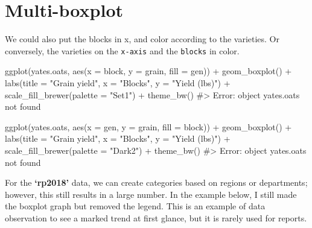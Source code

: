 \documentclass[
  letterpaper,
  DIV=11,
  numbers=noendperiod]{scrreprt}
\newenvironment{Shaded}{\begin{snugshade}}{\end{snugshade}}
\newcommand{\AttributeTok}[1]{\textcolor[rgb]{0.40,0.45,0.13}{#1}}
\newcommand{\CommentTok}[1]{\textcolor[rgb]{0.37,0.37,0.37}{#1}}
\newcommand{\FunctionTok}[1]{\textcolor[rgb]{0.28,0.35,0.67}{#1}}
\newcommand{\NormalTok}[1]{\textcolor[rgb]{0.00,0.23,0.31}{#1}}
\newcommand{\SpecialCharTok}[1]{\textcolor[rgb]{0.37,0.37,0.37}{#1}}
\newcommand{\StringTok}[1]{\textcolor[rgb]{0.13,0.47,0.30}{#1}}
\begin{document}
\section{Multi-boxplot}\label{multi-boxplot}

We could also put the blocks in x, and color according to the varieties.
Or conversely, the varieties on the \texttt{x-axis} and the
\texttt{blocks} in color.

\begin{Shaded}
\begin{Highlighting}[]

\FunctionTok{ggplot}\NormalTok{(yates.oats, }\FunctionTok{aes}\NormalTok{(}\AttributeTok{x =}\NormalTok{ block, }\AttributeTok{y =}\NormalTok{ grain, }\AttributeTok{fill =}\NormalTok{ gen)) }\SpecialCharTok{+}
  \FunctionTok{geom\_boxplot}\NormalTok{() }\SpecialCharTok{+}
  \FunctionTok{labs}\NormalTok{(}\AttributeTok{title =} \StringTok{"Grain yield"}\NormalTok{, }\AttributeTok{x =} \StringTok{"Blocks"}\NormalTok{, }\AttributeTok{y =} \StringTok{"Yield (lbs)"}\NormalTok{) }\SpecialCharTok{+}
  \FunctionTok{scale\_fill\_brewer}\NormalTok{(}\AttributeTok{palette =} \StringTok{"Set1"}\NormalTok{) }\SpecialCharTok{+}
  \FunctionTok{theme\_bw}\NormalTok{()}
\CommentTok{\#\textgreater{} Error: object \textquotesingle{}yates.oats\textquotesingle{} not found}


\FunctionTok{ggplot}\NormalTok{(yates.oats, }\FunctionTok{aes}\NormalTok{(}\AttributeTok{x =}\NormalTok{ gen, }\AttributeTok{y =}\NormalTok{ grain, }\AttributeTok{fill =}\NormalTok{ block)) }\SpecialCharTok{+}
  \FunctionTok{geom\_boxplot}\NormalTok{() }\SpecialCharTok{+}
  \FunctionTok{labs}\NormalTok{(}\AttributeTok{title =} \StringTok{"Grain yield"}\NormalTok{, }\AttributeTok{x =} \StringTok{"Blocks"}\NormalTok{, }\AttributeTok{y =} \StringTok{"Yield (lbs)"}\NormalTok{) }\SpecialCharTok{+}
  \FunctionTok{scale\_fill\_brewer}\NormalTok{(}\AttributeTok{palette =} \StringTok{"Dark2"}\NormalTok{) }\SpecialCharTok{+}
  \FunctionTok{theme\_bw}\NormalTok{()}
\CommentTok{\#\textgreater{} Error: object \textquotesingle{}yates.oats\textquotesingle{} not found}
\end{Highlighting}
\end{Shaded}

For the \textbf{`rp2018'} data, we can create categories based on
regions or departments; however, this still results in a large number.
In the example below, I still made the boxplot graph but removed the
legend. This is an example of data observation to see a marked trend at
first glance, but it is rarely used for reports.
\end{document}
